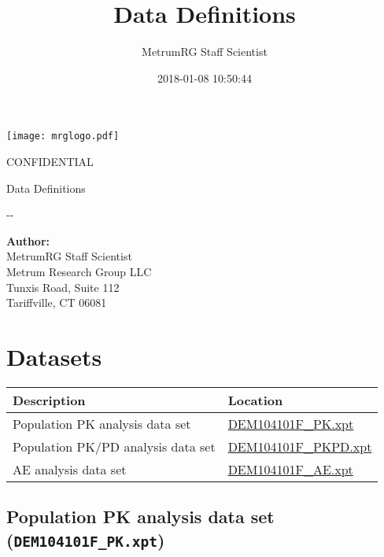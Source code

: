 \documentclass[]{article}
\title{Data Definitions}
\author{MetrumRG Staff Scientist}
\date{2018-01-08 10:50:44}
\newcommand{\todaymetrum}{\the\year-\twodigit{\month}-\twodigit{\day}}
\newcommand{\doctitle}{Data Definitions}
\newcommand{\scientist}{MetrumRG Staff Scientist}
\begin{document}
\begin{center}
\texttt{[image: mrglogo.pdf]}
\vspace{1cm}

{\Large CONFIDENTIAL}
\vspace{3.0cm}

{\huge \doctitle}
\vspace{1cm}

\todaymetrum
\vspace{6cm}

{\large\bfseries Author:}\\
\scientist \\
 Metrum Research Group LLC\\
Tunxis Road, Suite 112\\
Tariffville, CT 06081\\
\end{center}


\newpage



\section{Datasets}\label{datasets}

\begin{tabular}{|p{2.85in}|p{2.55in}|}
\hline
Description & Location\\
\hline
Population PK analysis data set & \hyperref[DEM104101F_PK]{DEM104101F\_PK.xpt}\\
\hline
Population PK/PD analysis data set & \hyperref[DEM104101F_PKPD]{DEM104101F\_PKPD.xpt}\\
\hline
AE analysis data set & \hyperref[DEM104101F_AE]{DEM104101F\_AE.xpt}\\
\hline
\end{tabular}

\subsection{\texorpdfstring{Population PK analysis data set
(\texttt{DEM104101F\_PK.xpt})
\label{DEM104101F_PK}}{Population PK analysis data set (DEM104101F\_PK.xpt) }}\label{population-pk-analysis-data-set-dem104101f_pk.xpt}

\noindent
\end{document}
